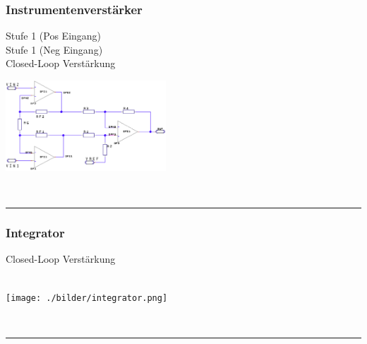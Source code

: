		\subsubsection{Instrumentenverstärker}
		    \begin{minipage}[T]{13cm}
		        Stufe 1 (Pos Eingang)
                \hspace{8.3mm}\\
                Stufe 1 (Neg Eingang)
                \hspace{8mm}\\
                Closed-Loop Verst\"arkung
                \hspace{3.4mm}
		    \end{minipage}
		    \begin{minipage}{6cm}
          	    \includegraphics[width=6cm]{./bilder/Instrumentationsverstaerker.png} 
            \end{minipage}\\
\hrule

        \subsubsection{Integrator}
            \begin{minipage}[T]{13cm}
                Closed-Loop Verst\"arkung
                \hspace{3mm}\\
                \hspace*{42mm} \\
            \end{minipage} 
            \begin{minipage}{6cm}
                \texttt{[image: ./bilder/integrator.png]} 
            \end{minipage}\\		
\hrule

